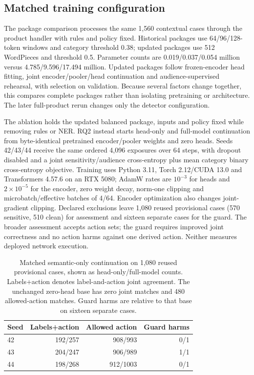 \documentclass[sigconf]{acmart}
\theoremstyle{acmdefinition}\newtheorem{property}{Property}
\begin{document}
\subsection*{Matched training configuration}
The package comparison processes the same 1,560 contextual cases through the product handler with rules and policy fixed. Historical packages use 64/96/128-token windows and category threshold 0.38; updated packages use 512 WordPieces and threshold 0.5. Parameter counts are 0.019/0.037/0.054 million versus 4.785/9.596/17.494 million. Updated packages follow frozen-encoder head fitting, joint encoder/pooler/head continuation and audience-supervised rehearsal, with selection on validation. Because several factors change together, this compares complete packages rather than isolating pretraining or architecture. The later full-product rerun changes only the detector configuration.

The ablation holds the updated balanced package, inputs and policy fixed while removing rules or NER. RQ2 instead starts head-only and full-model continuation from byte-identical pretrained encoder/pooler weights and zero heads. Seeds 42/43/44 receive the same ordered 4,096 exposures over 64 steps, with dropout disabled and a joint sensitivity/audience cross-entropy plus mean category binary cross-entropy objective. Training uses Python 3.11, Torch 2.12/CUDA 13.0 and Transformers 4.57.6 on an RTX 5080; AdamW rates are $10^{-3}$ for heads and $2\times10^{-5}$ for the encoder, zero weight decay, norm-one clipping and microbatch/effective batches of 4/64. Encoder optimization also changes joint-gradient clipping. Declared exclusions leave 1,080 reused provisional cases (570 sensitive, 510 clean) for assessment and sixteen separate cases for the guard. The broader assessment accepts action sets; the guard requires improved joint correctness and no action harms against one derived action. Neither measures deployed network execution.

\begin{table}[!t]
\centering
\caption{Matched semantic-only continuation on 1,080 reused provisional cases, shown as head-only/full-model counts. Labels+action denotes label-and-action joint agreement. The unchanged zero-head base has zero joint matches and 480 allowed-action matches. Guard harms are relative to that base on sixteen separate cases.}
\label{tab:matched_continuation}
\small
\begin{tabular}{lrrr}
\toprule
Seed & Labels+action & Allowed action & Guard harms \\
\midrule
42 &192/257 &908/993 &0/1 \\
43 &204/247 &906/989 &1/1 \\
44 &198/268 &912/1003 &0/1 \\
\bottomrule
\end{tabular}
\end{table}
\end{document}
